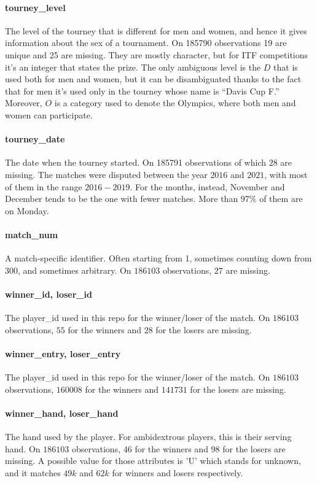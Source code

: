\documentclass{article}
\begin{document}
\paragraph{tourney\_level}
The level of the tourney that is different for men and women, and hence it gives information about the sex of a tournament. On 185790 observations 19 are unique and 25 are missing. They are mostly character, but for ITF competitions it's an integer that states the prize. The only ambiguous level is the $D$ that is used both for men and women, but it can be disambiguated thanks to the fact that for men it's used only in the tourney whose name is “Davis Cup F.” Moreover, $O$ is a category used to denote the Olympics, where both men and women can participate. 

\paragraph{tourney\_date}
The date when the tourney started. On 185791 observations of which $28$ are missing.
The matches were disputed between the year $2016$ and $2021$, with most of them in the range $2016-2019$. For the months, instead, November and December tends to be the one with fewer matches. More than 97\% of them are on Monday.

\paragraph{match\_num}
A match-specific identifier. Often starting from 1, sometimes counting
down from 300, and sometimes arbitrary. On $186103$ observations, $27$ are missing.

\paragraph{winner\_id, loser\_id}
The player\_id used in this repo for the winner/loser of the match. On $186103$ observations, $55$ for the winners and $28$ for the losers are missing.

\paragraph{winner\_entry, loser\_entry}
The player\_id used in this repo for the winner/loser of the match. On $186103$ observations, $160008$ for the winners and $141731$ for the losers are missing.

\paragraph{winner\_hand, loser\_hand}
The hand used by the player. For ambidextrous players, this is their serving hand. On $186103$ observations, $46$ for the winners and $98$ for the losers are missing. A possible value for those attributes is 'U' which stands for unknown, and it matches $49k$ and $62k$ for winners and losers respectively.
\end{document}
